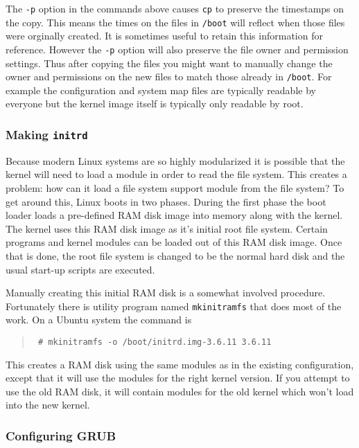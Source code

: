 \documentclass{article}
\newcommand{\command}[1]{\texttt{#1}}    %
\newcommand{\filename}[1]{\texttt{#1}}   %
\newenvironment{commands}
  {\begin{quote} \tt}
  {\end{quote}}
\begin{document}
The \command{-p} option in the commands above causes \command{cp} to preserve the timestamps on
the copy. This means the times on the files in \filename{/boot} will reflect when those files
were orginally created. It is sometimes useful to retain this information for reference. However
the \command{-p} option will also preserve the file owner and permission settings. Thus after
copying the files you might want to manually change the owner and permissions on the new files
to match those already in \filename{/boot}. For example the configuration and system map files
are typically readable by everyone but the kernel image itself is typically only readable by
root.

\subsubsection{Making \filename{initrd}}

Because modern Linux systems are so highly modularized it is possible that the kernel will need
to load a module in order to read the file system. This creates a problem: how can it load a
file system support module from the file system? To get around this, Linux boots in two phases.
During the first phase the boot loader loads a pre-defined RAM disk image into memory along with
the kernel. The kernel uses this RAM disk image as it's initial root file system. Certain
programs and kernel modules can be loaded out of this RAM disk image. Once that is done, the
root file system is changed to be the normal hard disk and the usual start-up scripts are
executed.

Manually creating this initial RAM disk is a somewhat involved procedure. Fortunately there is
utility program named \command{mkinitramfs} that does most of the work. On a Ubuntu system the
command is
\begin{commands}
\# mkinitramfs -o /boot/initrd.img-3.6.11 3.6.11
\end{commands}

This creates a RAM disk using the same modules as in the existing configuration, except that it
will use the modules for the right kernel version. If you attempt to use the old RAM disk, it
will contain modules for the old kernel which won't load into the new kernel.

\subsubsection{Configuring GRUB}
\end{document}

